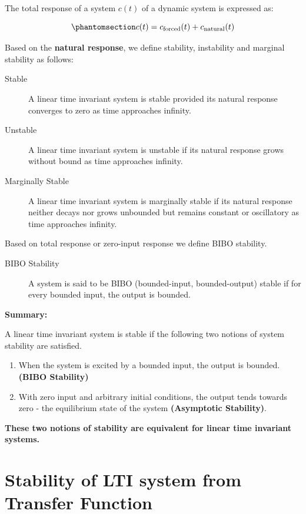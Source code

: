 \documentclass[
  14pt,
  a4paper,
  oneside,
  open=any,
  a4paper,
  14pt]{report}
\begin{document}
The total response of a system \(c(t)\) of a dynamic system is expressed
as:

\begin{equation}\phantomsection\label{eq-total-response}{
    c(t) = c_{\text{forced}}(t) + c_{\text{natural}}(t)
}\end{equation}

Based on the \textbf{natural response}, we define stability, instability
and marginal stability as follows:

\begin{description}
\item[Stable]
A linear time invariant system is stable provided its natural response
converges to zero as time approaches infinity.
\item[Unstable]
A linear time invariant system is unstable if its natural response grows
without bound as time approaches infinity.
\item[Marginally Stable]
A linear time invariant system is marginally stable if its natural
response neither decays nor grows unbounded but remains constant or
oscillatory as time approaches infinity.
\end{description}

Based on total response or zero-input response we define BIBO stability.

\begin{description}
\item[BIBO Stability]
A system is said to be BIBO (bounded-input, bounded-output) stable if
for every bounded input, the output is bounded.
\end{description}

\textbf{Summary:}

A linear time invariant system is stable if the following two notions of
system stability are satisfied.

\begin{enumerate}
\def\labelenumi{\alph{enumi}.}
\item
  When the system is excited by a bounded input, the output is bounded.
  \textbf{(BIBO Stability)}
\item
  With zero input and arbitrary initial conditions, the output tends
  towards zero - the equilibrium state of the system \textbf{(Asymptotic
  Stability)}.
\end{enumerate}

\textbf{These two notions of stability are equivalent for linear time
invariant systems.}

\section{Stability of LTI system from Transfer
Function}\label{stability-of-lti-system-from-transfer-function}
\end{document}
